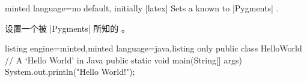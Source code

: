 \begin{docTcbKey}{minted language}{=}{no default, initially |latex|}
Sets a  known to |Pygments| .

设置一个被 |Pygments|  所知的 。


\begin{dispExample}
\begin{tcblisting}{listing engine=minted,minted language=java,listing only}
public class HelloWorld {
    // A `Hello World' in Java
    public static void main(String[] args) {
        System.out.println("Hello World!");
    }
}
\end{tcblisting}
\end{dispExample}
\end{docTcbKey}


